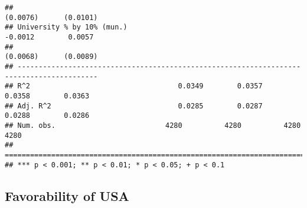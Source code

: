 \documentclass[
]{article}
\begin{document}
\begin{verbatim}
##                                                                  (0.0076)      (0.0101)  
## University % by 10% (mun.)                                       -0.0012        0.0057   
##                                                                  (0.0068)      (0.0089)  
## -----------------------------------------------------------------------------------------
## R^2                                   0.0349        0.0357        0.0358        0.0363   
## Adj. R^2                              0.0285        0.0287        0.0288        0.0286   
## Num. obs.                          4280          4280          4280          4280        
## =========================================================================================
## *** p < 0.001; ** p < 0.01; * p < 0.05; + p < 0.1
\end{verbatim}

\hypertarget{favorability-of-usa-5}{%
\subsection{Favorability of USA}\label{favorability-of-usa-5}}
\end{document}

